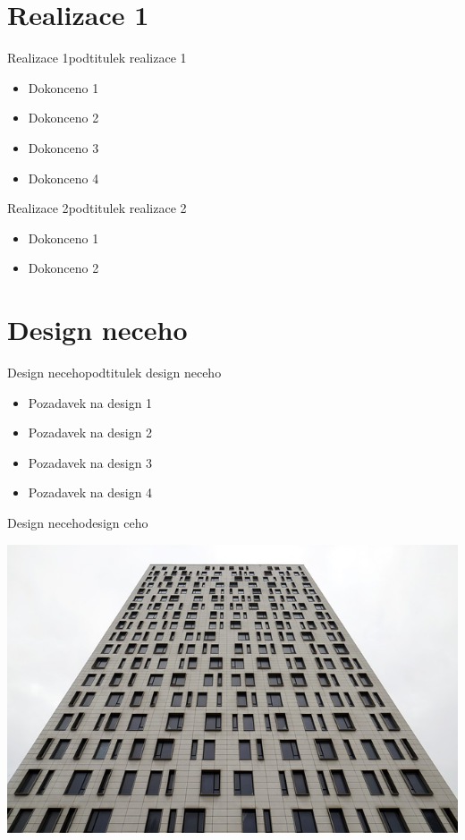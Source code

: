 \documentclass[czech,aspectratio=169]{beamer}
\begin{document}
    \section{Realizace 1}
    \begin{frame}{Realizace 1}{podtitulek realizace 1}
        \begin{itemize}
            \item Dokonceno 1
            \item Dokonceno 2
            \item Dokonceno 3
            \item Dokonceno 4
        \end{itemize}
    \end{frame}
    
    \begin{frame}{Realizace 2}{podtitulek realizace 2}
        \begin{itemize}
            \item Dokonceno 1
            \item Dokonceno 2
        \end{itemize}
    \end{frame}
    
    \section{Design neceho}
    \begin{frame}{Design neceho}{podtitulek design neceho}
        \begin{itemize}
            \item Pozadavek na design 1
            \item Pozadavek na design 2
            \item Pozadavek na design 3
            \item Pozadavek na design 4
        \end{itemize}
    \end{frame}
    
    \begin{frame}{Design neceho}{design ceho}
        \begin{center}
            \includegraphics[width=0.6\paperwidth]{pic02.jpg}
        \end{center}
    \end{frame}
    
\end{document}
